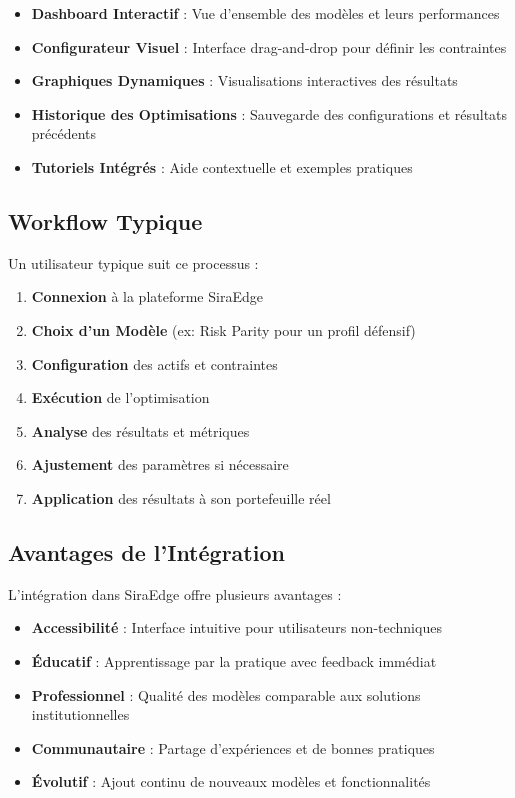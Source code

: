 \documentclass[11pt,a4paper]{article}
\begin{document}
\begin{itemize}
\item \textbf{Dashboard Interactif} : Vue d'ensemble des modèles et leurs performances
\item \textbf{Configurateur Visuel} : Interface drag-and-drop pour définir les contraintes
\item \textbf{Graphiques Dynamiques} : Visualisations interactives des résultats
\item \textbf{Historique des Optimisations} : Sauvegarde des configurations et résultats précédents
\item \textbf{Tutoriels Intégrés} : Aide contextuelle et exemples pratiques
\end{itemize}

\subsection{Workflow Typique}
Un utilisateur typique suit ce processus :

\begin{enumerate}
\item \textbf{Connexion} à la plateforme SiraEdge
\item \textbf{Choix d'un Modèle} (ex: Risk Parity pour un profil défensif)
\item \textbf{Configuration} des actifs et contraintes
\item \textbf{Exécution} de l'optimisation
\item \textbf{Analyse} des résultats et métriques
\item \textbf{Ajustement} des paramètres si nécessaire
\item \textbf{Application} des résultats à son portefeuille réel
\end{enumerate}

\subsection{Avantages de l'Intégration}
L'intégration dans SiraEdge offre plusieurs avantages :

\begin{itemize}
\item \textbf{Accessibilité} : Interface intuitive pour utilisateurs non-techniques
\item \textbf{Éducatif} : Apprentissage par la pratique avec feedback immédiat
\item \textbf{Professionnel} : Qualité des modèles comparable aux solutions institutionnelles
\item \textbf{Communautaire} : Partage d'expériences et de bonnes pratiques
\item \textbf{Évolutif} : Ajout continu de nouveaux modèles et fonctionnalités
\end{itemize}
\end{document}
